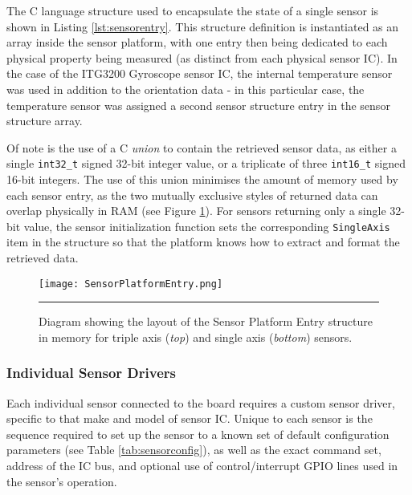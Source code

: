 The C language structure used to encapsulate the state of a single sensor is shown in Listing \ref{lst:sensorentry}. This structure definition is instantiated as an array inside the sensor platform, with one entry then being dedicated to each physical property being measured (as distinct from each physical sensor IC). In the case of the ITG3200 Gyroscope sensor IC, the internal temperature sensor was used in addition to the orientation data - in this particular case, the temperature sensor was assigned a second sensor structure entry in the sensor structure array.



Of note is the use of a C \textit{union} to contain the retrieved sensor data, as either a single \lstinline{int32_t} signed 32-bit integer value, or a triplicate of three \lstinline{int16_t} signed 16-bit integers. The use of this union minimises the amount of memory used by each sensor entry, as the two mutually exclusive styles of returned data can overlap physically in RAM (see Figure \ref{fig:sensorentry}). For sensors returning only a single 32-bit value, the sensor initialization function sets the corresponding \lstinline{SingleAxis} item in the structure so that the platform knows how to extract and format the retrieved data.

\begin{figure}[tbph]
	\vspace{1em}
	\centering
		\texttt{[image: SensorPlatformEntry.png]}
	\rule{35em}{0.5pt}
	\caption[Sensor Platform Entry Structure Diagram]{Diagram showing the layout of the Sensor Platform Entry structure in memory for triple axis (\textit{top}) and single axis (\textit{bottom}) sensors.}
	\label{fig:sensorentry}
\end{figure}

\FloatBarrier
\subsubsection{Individual Sensor Drivers}

Each individual sensor connected to the board requires a custom sensor driver, specific to that make and model of sensor IC. Unique to each sensor is the sequence required to set up the sensor to a known set of default configuration parameters (see Table \ref{tab:sensorconfig}), as well as the exact command set, address of the IC bus, and optional use of control/interrupt GPIO lines used in the sensor's operation.

